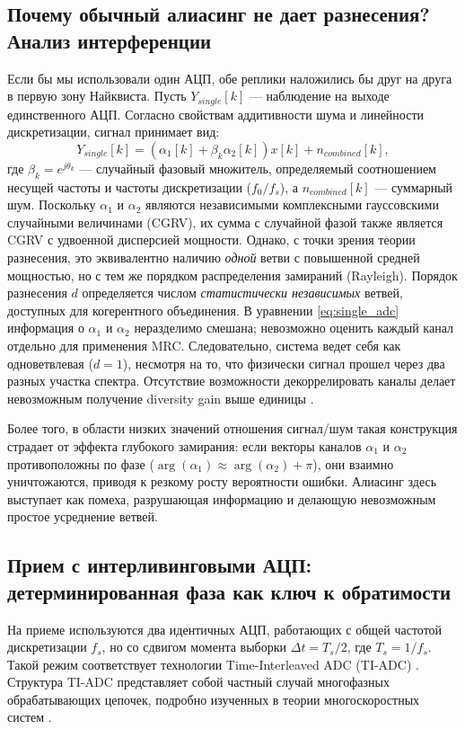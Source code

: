 \documentclass[a4paper,12pt]{article}
\numberwithin{equation}{section}
\begin{document}
\subsection{Почему обычный алиасинг не дает разнесения? Анализ интерференции}
Если бы мы использовали один АЦП, обе реплики наложились бы друг на друга в первую зону Найквиста. Пусть $Y_{single}[k]$ — наблюдение на выходе единственного АЦП. Согласно свойствам аддитивности шума и линейности дискретизации, сигнал принимает вид:
\begin{equation}
Y_{single}[k] = (\alpha_1[k] + \beta_k \alpha_2[k]) x[k] + n_{combined}[k],
\label{eq:single_adc}
\end{equation}
где $\beta_k = e^{j \theta_k}$ — случайный фазовый множитель, определяемый соотношением несущей частоты и частоты дискретизации ($f_0/f_s$), а $n_{combined}[k]$ — суммарный шум. Поскольку $\alpha_1$ и $\alpha_2$ являются независимыми комплексными гауссовскими случайными величинами (CGRV), их сумма с случайной фазой также является CGRV с удвоенной дисперсией мощности. Однако, с точки зрения теории разнесения, это эквивалентно наличию \textit{одной} ветви с повышенной средней мощностью, но с тем же порядком распределения замираний (Rayleigh). Порядок разнесения $d$ определяется числом \textit{статистически независимых} ветвей, доступных для когерентного объединения. В уравнении \eqref{eq:single_adc} информация о $\alpha_1$ и $\alpha_2$ неразделимо смешана; невозможно оценить каждый канал отдельно для применения MRC. Следовательно, система ведет себя как одноветвлевая ($d=1$), несмотря на то, что физически сигнал прошел через два разных участка спектра. Отсутствие возможности декоррелировать каналы делает невозможным получение diversity gain выше единицы \cite{proakis}.

Более того, в области низких значений отношения сигнал/шум такая конструкция страдает от эффекта глубокого замирания: если векторы каналов $\alpha_1$ и $\alpha_2$ противоположны по фазе ($\arg(\alpha_1) \approx \arg(\alpha_2) + \pi$), они взаимно уничтожаются, приводя к резкому росту вероятности ошибки. Алиасинг здесь выступает как помеха, разрушающая информацию и делающую невозможным простое усреднение ветвей.

\subsection{Прием с интерливинговыми АЦП: детерминированная фаза как ключ к обратимости}
На приеме используются два идентичных АЦП, работающих с общей частотой дискретизации $f_s$, но со сдвигом момента выборки $\Delta t = T_s / 2$, где $T_s = 1/f_s$. Такой режим соответствует технологии Time-Interleaved ADC (TI-ADC) \cite{walden,rajeswaran,tsai}. Структура TI-ADC представляет собой частный случай многофазных обрабатывающих цепочек, подробно изученных в теории многоскоростных систем \cite{vaidyanathan}.
\end{document}
